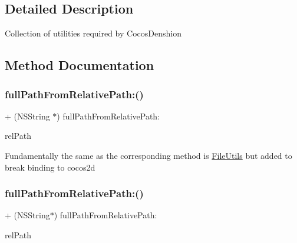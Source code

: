 \subsection{Detailed Description}
Collection of utilities required by Cocos\+Denshion 

\subsection{Method Documentation}
\mbox{\label{interfaceCDUtilities_a0b870cdbce4ca5a7f13a992034d668d6}} 
\subsubsection{\texorpdfstring{full\+Path\+From\+Relative\+Path\+:()}{fullPathFromRelativePath:()}\hspace{0.1cm}{\footnotesize\ttfamily [1/4]}}
{\footnotesize\ttfamily + (N\+S\+String $\ast$) full\+Path\+From\+Relative\+Path\+: \begin{DoxyParamCaption}\item[{(N\+S\+String$\ast$)}]{rel\+Path }\end{DoxyParamCaption}}

Fundamentally the same as the corresponding method is \hyperlink{classFileUtils}{File\+Utils} but added to break binding to cocos2d \mbox{\label{interfaceCDUtilities_a1b7fe6a2b7074ed0e031ec420e172862}} 
\subsubsection{\texorpdfstring{full\+Path\+From\+Relative\+Path\+:()}{fullPathFromRelativePath:()}\hspace{0.1cm}{\footnotesize\ttfamily [2/4]}}
{\footnotesize\ttfamily + (N\+S\+String$\ast$) full\+Path\+From\+Relative\+Path\+: \begin{DoxyParamCaption}\item[{(N\+S\+String $\ast$)}]{rel\+Path }\end{DoxyParamCaption}}

